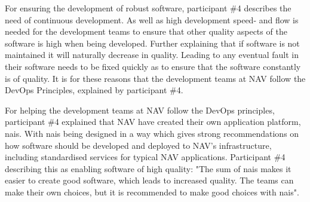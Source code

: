 For ensuring the development of robust software, participant \#4 describes the need of continuous development. As well as high development speed- and flow is needed for the development teams to ensure that other quality aspects of the software is high when being developed. Further explaining that if software is not maintained it will naturally decrease in quality. Leading to any eventual fault in their software needs to be fixed quickly as to ensure that the software constantly is of quality. It is for these reasons that the development teams at NAV follow the DevOps Principles, explained by participant \#4.


For helping the development teams at NAV follow the DevOps principles, participant \#4 explained that NAV have created their own application platform, \gls{nais}. With \gls{nais} being designed in a way which gives strong recommendations on how software should be developed and deployed to NAV's infrastructure, including standardised services for typical NAV applications. Participant \#4 describing this as enabling software of high quality: "The sum of \gls{nais} makes it easier to create good software, which leads to increased quality. The teams can make their own choices, but it is recommended to make good choices with \gls{nais}".

